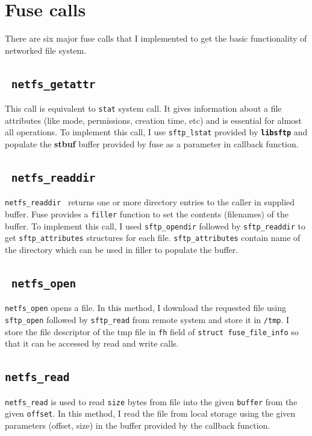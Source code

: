 \documentclass[10pt] {article}
\begin{document}
\section {Fuse calls}
There are six major fuse calls that I implemented to get the basic functionality of networked file system. 
\subsection { \texttt{ netfs\_getattr } }
This call is equivalent to \texttt{stat} system call. It gives information about a file attributes (like mode, permissions, creation time, etc) and is essential for almost all operations. To implement this call, I use \texttt{sftp\_lstat} provided by \textbf{\texttt{libsftp}} and populate the \textbf{stbuf} buffer provided by fuse as a parameter in callback function.

\subsection { \texttt{ netfs\_readdir } }
\texttt{netfs\_readdir } returns one or more directory entries to the caller in supplied buffer. Fuse provides a \texttt{filler} function to set the contents (filenames) of the buffer. To implement this call, I used \texttt{sftp\_opendir} followed by \texttt{sftp\_readdir} to get \texttt{sftp\_attributes} structures for each file. \texttt{sftp\_attributes} contain name of the directory which can be used in filler to populate the buffer. 

\subsection{\texttt{ netfs\_open}}
\texttt{netfs\_open} opens a file. In this method, I download the requested file using \texttt{sftp\_open} followed by \texttt{sftp\_read} from remote system and store it in \texttt{/tmp}. I store the file descriptor of the tmp file in \texttt{fh} field of  \texttt{struct fuse\_file\_info} so that it can be accessed by read and write calls. 

\subsection {\texttt{netfs\_read}}
\texttt{netfs\_read} is used to read \texttt{size} bytes from file into the given \texttt{buffer} from the given \texttt{offset}. In this method, I read the file from local storage using the given parameters (offset, size) in the buffer provided by the callback function.
\end{document}
